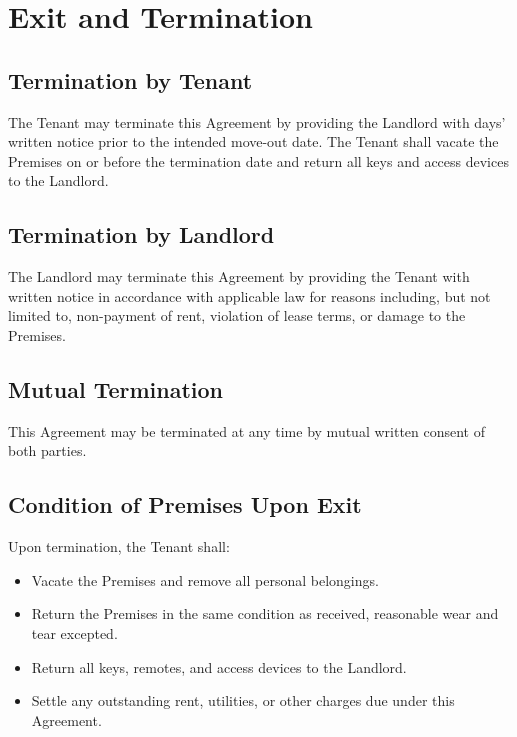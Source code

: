 
\section{Exit and Termination}
\label{sec:exit}

\subsection{Termination by Tenant}
\label{sec:tenanttermination}
The Tenant may terminate this Agreement by providing the Landlord with \NoticePeriod{} days’ written notice prior to the intended move-out date. The Tenant shall vacate the Premises on or before the termination date and return all keys and access devices to the Landlord.

\subsection{Termination by Landlord}
\label{sec:landlordtermination}
The Landlord may terminate this Agreement by providing the Tenant with written notice in accordance with applicable law for reasons including, but not limited to, non-payment of rent, violation of lease terms, or damage to the Premises.

\subsection{Mutual Termination}
\label{sec:mutualtermination}
This Agreement may be terminated at any time by mutual written consent of both parties.

\subsection{Condition of Premises Upon Exit}
\label{sec:exitpremisecondition}
Upon termination, the Tenant shall:

\begin{itemize}
  \item Vacate the Premises and remove all personal belongings.
  \item Return the Premises in the same condition as received, reasonable wear and tear excepted.
  \item Return all keys, remotes, and access devices to the Landlord.
  \item Settle any outstanding rent, utilities, or other charges due under this Agreement.
\end{itemize}

